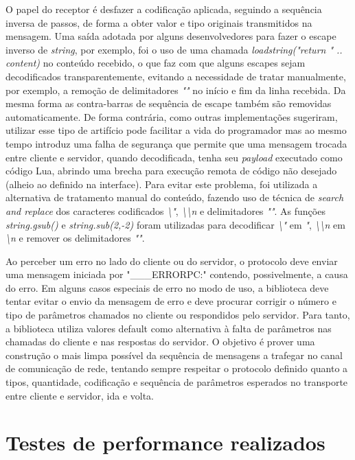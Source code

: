 \documentclass[11pt]{article}
\begin{document}
O papel do receptor é desfazer a codificação aplicada, seguindo a sequência
inversa de passos, de forma a obter valor e tipo originais transmitidos na
mensagem. Uma saída adotada por alguns desenvolvedores para fazer o escape
inverso de \textit{string}, por exemplo, foi o uso de uma chamada
\textit{loadstring("return " .. content)} no conteúdo recebido, o que faz com
que alguns escapes sejam decodificados transparentemente, evitando a
necessidade de tratar manualmente, por exemplo, a remoção de delimitadores
\textit{""} no início e fim da linha recebida. Da mesma forma as contra-barras
de sequência de escape também são removidas automaticamente. De forma
contrária, como outras implementações sugeriram, utilizar esse tipo de
artifício pode facilitar a vida do programador mas ao mesmo tempo introduz uma
falha de segurança que permite que uma mensagem trocada entre cliente e
servidor, quando decodificada, tenha seu \textit{payload} executado como código
Lua, abrindo uma brecha para execução remota de código não desejado (alheio ao
definido na interface). Para evitar este problema, foi utilizada a alternativa
de tratamento manual do conteúdo, fazendo uso de técnica de \textit{search and
replace} dos caracteres codificados \textit{\textbackslash{}"},
\textit{\textbackslash{}\textbackslash{}n} e delimitadores \textit{""}. As
funções \textit{string.gsub()} e \textit{string.sub(2,-2)} foram utilizadas
para decodificar \textit{\textbackslash{}"} em \textit{"},
\textit{\textbackslash{}\textbackslash{}n} em \textit{\textbackslash{}n} e
remover os delimitadores \textit{""}.

Ao perceber um erro no lado do cliente ou do servidor, o protocolo deve enviar
uma mensagem iniciada por "\_\_\_ERRORPC:" contendo, possivelmente, a causa do
erro. Em alguns casos especiais de erro no modo de uso, a biblioteca deve
tentar evitar o envio da mensagem de erro e deve procurar corrigir o número e
tipo de parâmetros chamados no cliente ou respondidos pelo servidor. Para
tanto, a biblioteca utiliza valores default como alternativa à falta de
parâmetros nas chamadas do cliente e nas respostas do servidor. O objetivo é
prover uma construção o mais limpa possível da sequência de mensagens a
trafegar no canal de comunicação de rede, tentando sempre respeitar o protocolo
definido quanto a tipos, quantidade, codificação e sequência de parâmetros
esperados no transporte entre cliente e servidor, ida e volta.

\section{Testes de performance realizados}\label{sec:perf}
\end{document}
